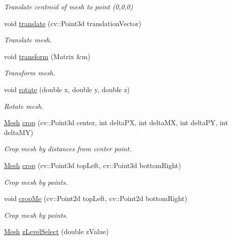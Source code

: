\begin{DoxyCompactItemize}
\begin{DoxyCompactList}\small\item\em Translate centroid of mesh to point (0,0,0) \end{DoxyCompactList}\item 
void \hyperlink{class_mesh_aae3c2893ee25abbff8feea44d724ddb4}{translate} (cv\+::\+Point3d translation\+Vector)
\begin{DoxyCompactList}\small\item\em Translate mesh. \end{DoxyCompactList}\item 
void \hyperlink{class_mesh_a8f1702ee51f0c3d0bd980c665b5d6952}{transform} (Matrix \&m)
\begin{DoxyCompactList}\small\item\em Transform mesh. \end{DoxyCompactList}\item 
void \hyperlink{class_mesh_a89e4e340939aa89534978c60ca690466}{rotate} (double x, double y, double z)
\begin{DoxyCompactList}\small\item\em Rotate mesh. \end{DoxyCompactList}\item 
\hyperlink{class_mesh}{Mesh} \hyperlink{class_mesh_a0b6bce98a99444eb3daf42d213ba89ab}{crop} (cv\+::\+Point3d center, int delta\+P\+X, int delta\+M\+X, int delta\+P\+Y, int delta\+M\+Y)
\begin{DoxyCompactList}\small\item\em Crop mesh by distances from center point. \end{DoxyCompactList}\item 
\hyperlink{class_mesh}{Mesh} \hyperlink{class_mesh_a1ebf5c007fa538e183d06cb021c6fac4}{crop} (cv\+::\+Point3d top\+Left, cv\+::\+Point3d bottom\+Right)
\begin{DoxyCompactList}\small\item\em Crop mesh by points. \end{DoxyCompactList}\item 
void \hyperlink{class_mesh_ab7eda900a4a92c5eee9eeb7a6c65d09a}{crop\+Me} (cv\+::\+Point2d top\+Left, cv\+::\+Point2d bottom\+Right)
\begin{DoxyCompactList}\small\item\em Crop mesh by points. \end{DoxyCompactList}\item 
\hyperlink{class_mesh}{Mesh} \hyperlink{class_mesh_a10b3d6d6b111a68eb380e7e125a8bfd2}{z\+Level\+Select} (double z\+Value)

\end{DoxyCompactItemize}
